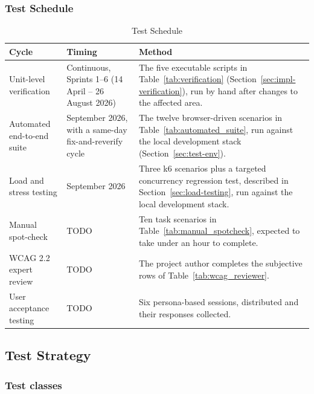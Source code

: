 \documentclass[12pt, oneside]{article} %
\begin{document}
\subsubsection{Test Schedule}

\begin{table}[H]
\caption{Test Schedule}
\label{tab:test_schedule}
\vspace{-4mm}
\begin{center}
\renewcommand{\arraystretch}{1.2}
\footnotesize
\begin{tabular}{|>{\raggedright\arraybackslash}p{3.3cm}|>{\raggedright\arraybackslash}p{3.4cm}|>{\raggedright\arraybackslash}p{6.6cm}|}
\hline
\textbf{Cycle} & \textbf{Timing} & \textbf{Method} \\
\hline \hline
Unit-level verification & Continuous, Sprints 1--6 (14 April -- 26 August 2026) & The five executable scripts in Table~\ref{tab:verification} (Section~\ref{sec:impl-verification}), run by hand after changes to the affected area. \\ \hline
Automated end-to-end suite & 3 September 2026, with a same-day fix-and-reverify cycle & The twelve browser-driven scenarios in Table~\ref{tab:automated_suite}, run against the local development stack (Section~\ref{sec:test-env}). \\ \hline
Load and stress testing & 3 September 2026 & Three k6 scenarios plus a targeted concurrency regression test, described in Section~\ref{sec:load-testing}, run against the local development stack. \\ \hline
Manual spot-check & TODO & Ten task scenarios in Table~\ref{tab:manual_spotcheck}, expected to take under an hour to complete. \\ \hline
WCAG 2.2 expert review & TODO & The project author completes the subjective rows of Table~\ref{tab:wcag_reviewer}. \\ \hline
User acceptance testing & TODO & Six persona-based sessions, distributed and their responses collected. \\ \hline
\end{tabular}
\end{center}
\end{table}

\subsection{Test Strategy}

\subsubsection{Test classes}
\end{document}
